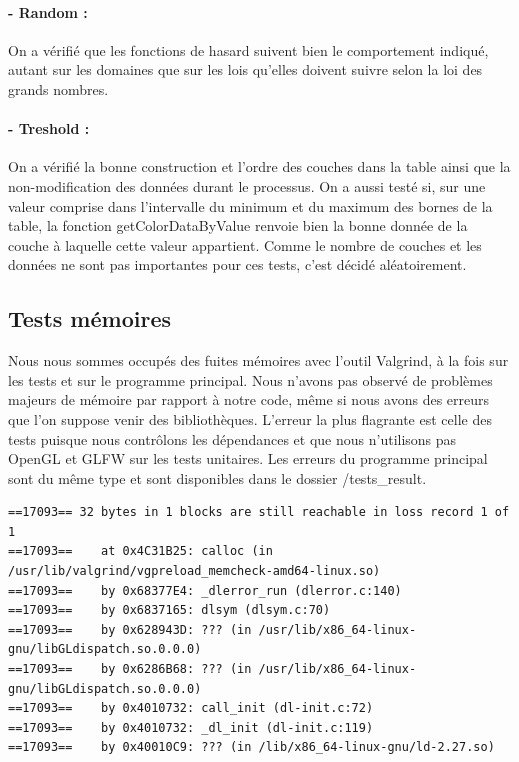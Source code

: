 \documentclass[a4paper]{article}
\begin{document}
\paragraph{- Random :} On a vérifié que les fonctions de hasard suivent bien le comportement indiqué, autant sur les domaines que sur les lois qu'elles doivent suivre selon la loi des grands nombres.

\paragraph{- Treshold :} On a vérifié la bonne construction et l'ordre des couches dans la table ainsi que la non-modification des données durant le processus. 
On a aussi testé si, sur une valeur comprise dans l'intervalle du minimum et du maximum des bornes de la table, la fonction getColorDataByValue renvoie bien la bonne donnée de la couche à laquelle cette valeur appartient.
Comme le nombre de couches et les données ne sont pas importantes pour ces tests, c'est décidé aléatoirement.

\subsection{Tests mémoires}

Nous nous sommes occupés des fuites mémoires avec l'outil Valgrind, à la fois sur les tests et sur le programme principal.
Nous n'avons pas observé de problèmes majeurs de mémoire par rapport à notre code, même si nous avons des erreurs que l'on suppose venir des bibliothèques.
L'erreur la plus flagrante est celle des tests puisque nous contrôlons les dépendances et que nous n'utilisons pas OpenGL et GLFW sur les tests unitaires. Les erreurs du programme principal sont du même type et sont disponibles dans le dossier /tests\_result.

\begin{lstlisting}[caption= Extrait de la commande valgrind \\ 
\texttt{valgrind --leak-check=full --show-leak-kinds=all --log-file="../tests\_result/valgrind\_tests.txt" ./unit\_tests}]
==17093== 32 bytes in 1 blocks are still reachable in loss record 1 of 1
==17093==    at 0x4C31B25: calloc (in /usr/lib/valgrind/vgpreload_memcheck-amd64-linux.so)
==17093==    by 0x68377E4: _dlerror_run (dlerror.c:140)
==17093==    by 0x6837165: dlsym (dlsym.c:70)
==17093==    by 0x628943D: ??? (in /usr/lib/x86_64-linux-gnu/libGLdispatch.so.0.0.0)
==17093==    by 0x6286B68: ??? (in /usr/lib/x86_64-linux-gnu/libGLdispatch.so.0.0.0)
==17093==    by 0x4010732: call_init (dl-init.c:72)
==17093==    by 0x4010732: _dl_init (dl-init.c:119)
==17093==    by 0x40010C9: ??? (in /lib/x86_64-linux-gnu/ld-2.27.so)
\end{lstlisting}
\end{document}
